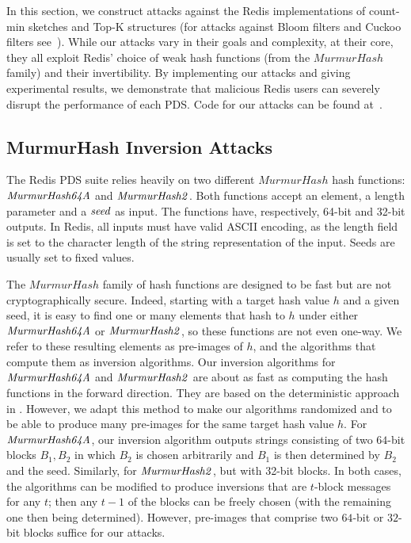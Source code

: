 In this section, we construct attacks against the Redis implementations of  count-min sketches and Top-K structures (for attacks against Bloom filters and Cuckoo filters see~\cite{cryptoeprint:2024/1312}). While our attacks vary in their goals and complexity, at their core, they all exploit Redis' choice of weak hash functions (from the $\mathit{MurmurHash}$ family) and their invertibility.
By implementing our attacks and giving experimental results, we demonstrate that malicious Redis users can severely disrupt the performance of each PDS. Code for our attacks can be found at~\cite{gitrepo}.

\subsection{MurmurHash Inversion Attacks}\label{sec:MurmurHash}
The Redis PDS suite relies heavily on two different $\mathit{MurmurHash}$ hash functions: $\mathit{MurmurHash64A}$ and $\mathit{MurmurHash2}$. Both functions accept an element, a length parameter and a $\mathit{seed}$ as input. The functions have, respectively, 64-bit and 32-bit outputs. In Redis, all inputs must have valid ASCII encoding, as the length field is set to the character length of the string representation of the input. Seeds are usually set to fixed values.

The $\mathit{MurmurHash}$ family of hash functions are designed to be fast but are not cryptographically secure. 
Indeed, starting with a target hash value $h$ and a given seed, it is easy to find one or many elements that hash to $h$ under either $\mathit{MurmurHash64A}$ or $\mathit{MurmurHash2}$, so these functions are not even one-way. 
We refer to these resulting elements as pre-images of $h$, and the algorithms that compute them as inversion algorithms. %
Our inversion algorithms for $\mathit{MurmurHash64A}$ and $\mathit{MurmurHash2}$ are about as fast as computing the hash functions in the forward direction. They are based on the deterministic approach in \cite{murmurhash64Ainv}. However, we adapt this method to make our algorithms randomized and to be able to produce many pre-images for the same target hash value $h$. 
For $\mathit{MurmurHash64A}$, our inversion algorithm outputs strings consisting of two $64$-bit blocks $B_1, B_2$ in which $B_2$ is chosen arbitrarily and $B_1$ is then determined by $B_2$ and the seed. 
Similarly, for $\mathit{MurmurHash2}$, but with 32-bit blocks. 
In both cases, the algorithms can be modified to produce inversions that are $t$-block messages for any $t$; then any $t-1$ of the blocks can be freely chosen (with the remaining one then being determined). 
However, pre-images that comprise two $64$-bit or $32$-bit blocks suffice for our attacks.

